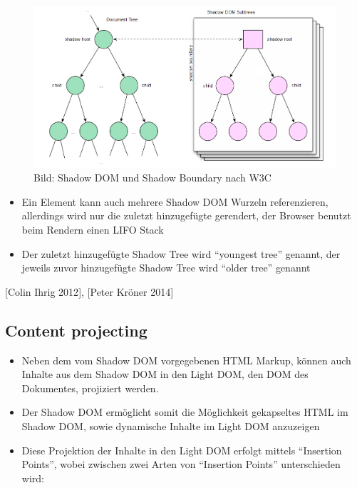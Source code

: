 \begin{figure}[htbp]
\centering
\includegraphics{images/2-shadow-dom-shadow-boundary.png}
\caption{Bild: Shadow DOM und Shadow Boundary nach W3C}
\end{figure}

\begin{itemize}
\tightlist
\item
  Ein Element kann auch mehrere Shadow DOM Wurzeln referenzieren,
  allerdings wird nur die zuletzt hinzugefügte gerendert, der Browser
  benutzt beim Rendern einen LIFO Stack
\item
  Der zuletzt hinzugefügte Shadow Tree wird ``youngest tree'' genannt,
  der jeweils zuvor hinzugefügte Shadow Tree wird ``older tree'' genannt
\end{itemize}

{[}Colin Ihrig 2012{]}, {[}Peter Kröner 2014{]}

\subsection{Content projecting}\label{content-projecting}

\begin{itemize}
\tightlist
\item
  Neben dem vom Shadow DOM vorgegebenen HTML Markup, können auch Inhalte
  aus dem Shadow DOM in den Light DOM, den DOM des Dokumentes,
  projiziert werden.
\item
  Der Shadow DOM ermöglicht somit die Möglichkeit gekapseltes HTML im
  Shadow DOM, sowie dynamische Inhalte im Light DOM anzuzeigen
\item
  Diese Projektion der Inhalte in den Light DOM erfolgt mittels
  ``Insertion Points'', wobei zwischen zwei Arten von ``Insertion
  Points'' unterschieden wird:
\end{itemize}

